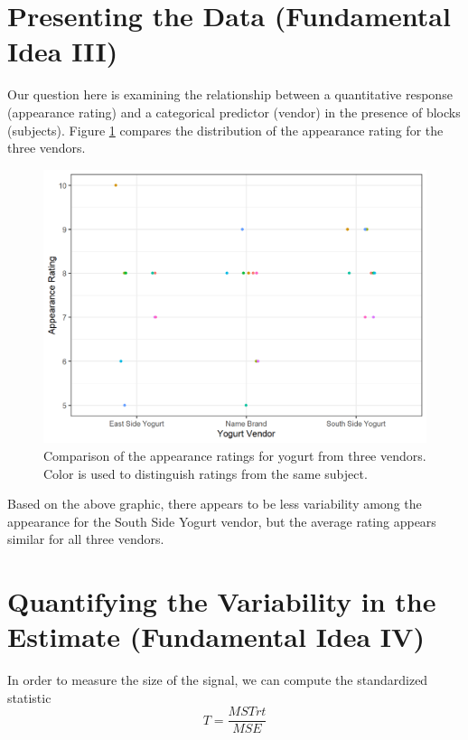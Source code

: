 \documentclass[
]{book}
\theoremstyle{plain}
\theoremstyle{mydefn}
\theoremstyle{myexmpl}
\theoremstyle{remark}
\begin{document}
\hypertarget{presenting-the-data-fundamental-idea-iii-2}{%
\section{Presenting the Data (Fundamental Idea III)}\label{presenting-the-data-fundamental-idea-iii-2}}

Our question here is examining the relationship between a quantitative response (appearance rating) and a categorical predictor (vendor) in the presence of blocks (subjects). Figure \ref{fig:blockrecap-plot} compares the distribution of the appearance rating for the three vendors.

\begin{figure}

{\centering \includegraphics[width=0.8\linewidth]{./Images/blockrecap-plot-1} 

}

\caption{Comparison of the appearance ratings for yogurt from three vendors. Color is used to distinguish ratings from the same subject.}\label{fig:blockrecap-plot}
\end{figure}

Based on the above graphic, there appears to be less variability among the appearance for the South Side Yogurt vendor, but the average rating appears similar for all three vendors.

\hypertarget{quantifying-the-variability-in-the-estimate-fundamental-idea-iv-2}{%
\section{Quantifying the Variability in the Estimate (Fundamental Idea IV)}\label{quantifying-the-variability-in-the-estimate-fundamental-idea-iv-2}}

In order to measure the size of the signal, we can compute the standardized statistic
\[T = \frac{MSTrt}{MSE}\]
\end{document}
